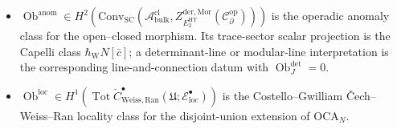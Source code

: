\documentclass[11pt]{memoir}
\begin{document}
\begin{thm}
\begin{itemize}
		      Lemma~\ref{lem:tate-casimir-obstruction}).  The all-scale
		      obstruction class is the class in
		      \(H^1(\mathcal Q^\bullet_{\mathrm{QME}}(I))\), where
		      \(\mathcal Q^\bullet_{\mathrm{QME}}(I)\) is the Roos complex of
		      the finite-window scale-\(L\) residual complexes with
		      Costello RG maps and window projections.  Thus this component is
		      a criterion unless the counterterm tower, propagator, RG maps,
		      projections, and completion data are constructed.  The counterterm primitive
		      \(\{C_{n,w,r,M,L}\}\), including its RG-scale and finite-window
		      Roos primitives, is an input solving this tower, not a
		      construction supplied by the present theorem.
	    \item
	      \(\operatorname{Ob}^{\mathrm{anom}}\in
	      H^2(\mathrm{Conv}_{\mathrm{SC}}(
	      \mathcal A^{\mathrm{cl}}_{\mathrm{bulk}},
	      Z^{\mathrm{der},\mathrm{Mor}}_{E_2^{\mathrm{HT}}}
	      (\mathcal C^{\mathrm{op}}_\partial)))\) is the operadic anomaly
	      class for the open--closed morphism.  Its trace-sector scalar
	      projection is the Capelli class \(\hbar_{\mathrm{W}}N[\bar c]\); a
	      determinant-line or modular-line interpretation is the corresponding
	      line-and-connection datum with \(\operatorname{Ob}^{\det}_J=0\).
	    \item
	      \(\operatorname{Ob}^{\mathrm{loc}}\in
	      H^1\!\left(
	      \operatorname{Tot}\check C^\bullet_{\mathrm{Weiss,Ran}}
	      (\mathfrak U;\mathcal E^\bullet_{\mathrm{loc}})\right)\) is the
	      Costello--Gwilliam \v{C}ech--Weiss--Ran locality class for the
	      disjoint-union extension of \(\mathrm{OCA}_N\).
	  \end{itemize}
\end{thm}
\end{document}
